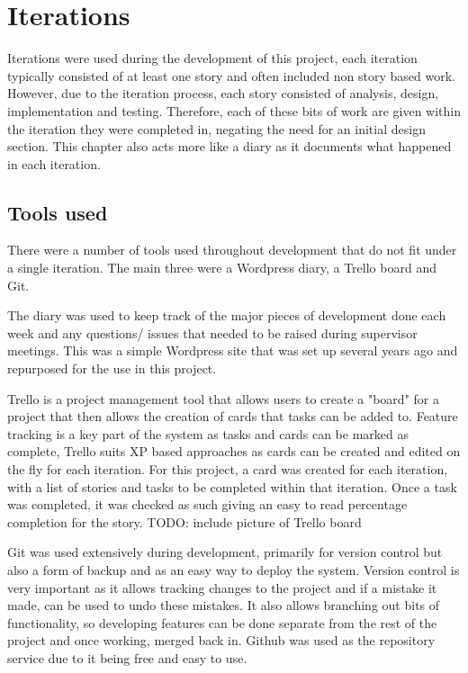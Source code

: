 \chapter{Iterations}
Iterations were used during the development of this project, each iteration typically consisted of at least one story and often included non story based work. However, due to the iteration process, each story consisted of analysis, design, implementation and testing. Therefore, each of these bits of work are given within the iteration they were completed in, negating the need for an initial design section. This chapter also acts more like a diary as it documents what happened in each iteration.

\section{Tools used}
There were a number of tools used throughout development that do not fit under a single iteration. The main three were a Wordpress diary, a Trello board and Git. 

The diary was used to keep track of the major pieces of development done each week and any questions/ issues that needed to be raised during supervisor meetings. This was a simple Wordpress site that was set up several years ago and repurposed for the use in this project.

Trello is a project management tool that allows users to create a "board" for a project that then allows the creation of cards that tasks can be added to\cite{trello}. Feature tracking is a key part of the system as tasks and cards can be marked as complete, Trello suits XP based approaches as cards can be created and edited on the fly for each iteration. For this project, a card was created for each iteration, with a list of stories and tasks to be completed within that iteration. Once a task was completed, it was checked as such giving an easy to read percentage completion for the story. TODO: include picture of Trello board

Git was used extensively during development, primarily for version control but also a form of backup and as an easy way to deploy the system. Version control is very important as it allows tracking changes to the project and if a mistake it made, can be used to undo these mistakes. It also allows branching out bits of functionality, so developing features can be done separate from the rest of the project and once working, merged back in. Github was used as the repository service due to it being free and easy to use\cite{github}.
\newpage

